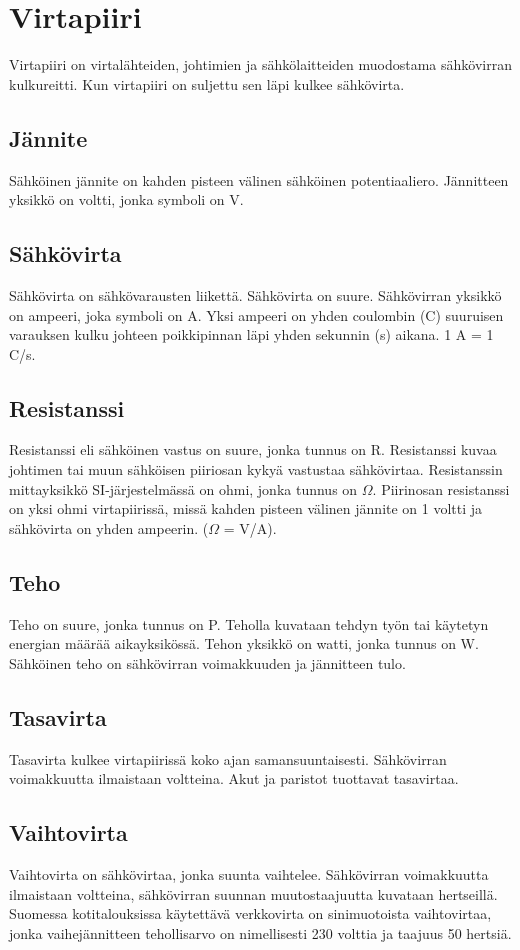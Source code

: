\section{Virtapiiri}
Virtapiiri on virtalähteiden, johtimien ja sähkölaitteiden muodostama sähkövirran kulkureitti. Kun virtapiiri on suljettu sen läpi kulkee sähkövirta.

\subsection*{Jännite}
Sähköinen jännite on kahden pisteen välinen sähköinen potentiaaliero. Jännitteen yksikkö on voltti, jonka symboli on V.
\subsection*{Sähkövirta}
Sähkövirta on sähkövarausten liikettä. Sähkövirta on suure. Sähkövirran yksikkö on ampeeri, joka symboli on A. Yksi ampeeri on yhden coulombin (C) suuruisen varauksen kulku johteen poikkipinnan läpi yhden sekunnin (s) aikana. 1 A = 1 C/s.

\subsection*{Resistanssi}
Resistanssi eli sähköinen vastus on suure, jonka tunnus on R. Resistanssi kuvaa johtimen tai muun sähköisen piiriosan kykyä vastustaa sähkövirtaa. Resistanssin mittayksikkö SI-järjestelmässä on ohmi, jonka tunnus on $\Omega$. Piirinosan resistanssi on yksi ohmi virtapiirissä, missä kahden pisteen välinen jännite on 1 voltti ja sähkövirta on yhden ampeerin.
($\Omega$ = V/A).
\subsection*{Teho}
Teho on suure, jonka tunnus on P. Teholla kuvataan tehdyn työn tai käytetyn energian määrää aikayksikössä. Tehon yksikkö on watti, jonka tunnus on W. Sähköinen teho on sähkövirran voimakkuuden  ja jännitteen tulo.
\subsection*{Tasavirta}
Tasavirta kulkee virtapiirissä koko ajan samansuuntaisesti. Sähkövirran voimakkuutta ilmaistaan voltteina. Akut ja paristot tuottavat tasavirtaa.

\subsection*{Vaihtovirta}
Vaihtovirta on sähkövirtaa, jonka suunta vaihtelee. Sähkövirran voimakkuutta ilmaistaan voltteina, sähkövirran suunnan muutostaajuutta kuvataan hertseillä. Suomessa kotitalouksissa käytettävä verkkovirta on sinimuotoista vaihtovirtaa, jonka vaihejännitteen tehollisarvo on nimellisesti 230 volttia ja taajuus 50 hertsiä.

